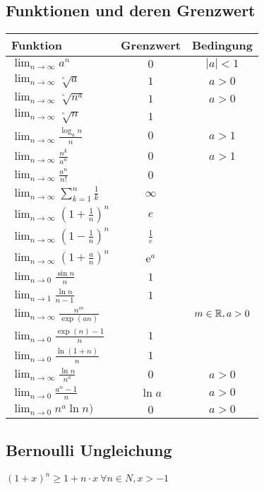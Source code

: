 \subsection{Funktionen und deren Grenzwert}
\begin{tabular}{l | c | c}
    Funktion & Grenzwert & Bedingung\\\hline
    $\lim_{n \to \infty} a^n$ & $0$ & $|a| < 1$\\\hline
    $\lim_{n \to \infty} \sqrt[^n]{a}$ & $1$ & $a > 0$\\\hline
    $\lim_{n \to \infty} \sqrt[^n]{n^a}$ & $1$ & $a > 0$\\\hline
    $\lim_{n \to \infty} \sqrt[^n]{n}$ & $1$\\\hline
    $\lim_{n \to \infty} \frac{\log_an}{n}$ & $0$ & $a > 1$\\\hline
    $\lim_{n \to \infty} \frac{n^k}{a^n}$ & $0$ & $a > 1$\\\hline
    $\lim_{n \to \infty} \frac{a^n}{n!}$ & $0$\\\hline
    $\lim_{n \to \infty} \sum_{k=1}^{n} \frac{1}{k}$ & $\infty$\\\hline
    $\lim_{n \to \infty} \left( 1 + \frac{1}{n} \right)^n$ & $e$\\\hline
    $\lim_{n \to \infty} \left( 1 - \frac{1}{n} \right)^n$ & $\frac{1}{e}$\\\hline
    $\lim_{n \to \infty} \left( 1 + \frac{a}{n} \right)^n$ &e$^a$\\\hline
    $\lim_{n \to 0} \frac{\sin n}{n}$ & $1$\\\hline
    $\lim_{n \to 1} \frac{\ln n}{n - 1}$ & $1$\\\hline
    $\lim_{n \to \infty} \frac{n^m}{\exp(an)}$ && $m \in \mathbb{R}, a > 0$\\\hline
    $\lim_{n \to 0} \frac{\exp(n) - 1}{n}$ & $1$\\\hline
    $\lim_{n \to 0} \frac{\ln(1 + n)}{n}$ & $1$\\\hline
    $\lim_{n \to \infty} \frac{\ln n}{n^a}$ & $0$ & $a > 0$\\\hline
    $\lim_{n \to 0} \frac{a^n - 1}{n}$ & $\ln a$ & $a > 0$\\\hline
    $\lim_{n \to 0} n^a \ln n)$ & $0$ & $a > 0$\\\hline
\end{tabular}

\subsection{Bernoulli Ungleichung}
$\left( 1 + x \right)^{n} \ge  1 + n \cdot x \ \forall n \in N, x > -1 $

